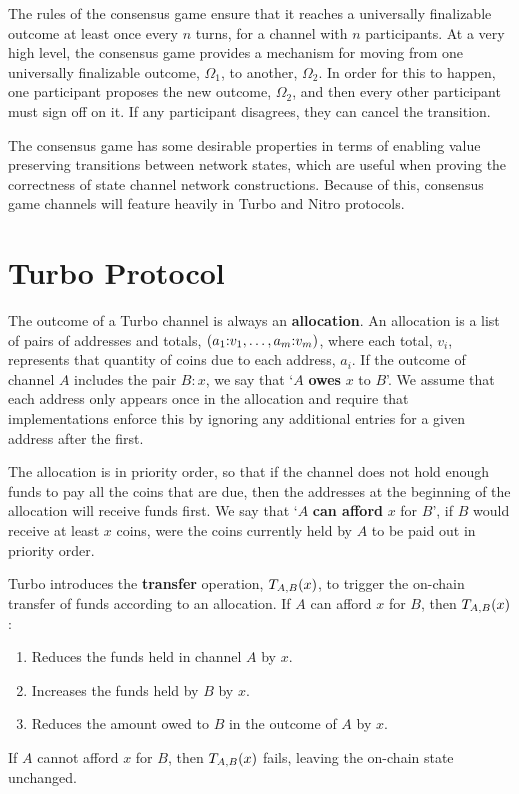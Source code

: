 \documentclass{article}
\begin{document}
The rules of the consensus game ensure that it reaches a universally finalizable outcome at least once every $n$ turns, for a channel with $n$ participants.
At a very high level, the consensus game provides a mechanism for moving from one universally
finalizable outcome, $\Omega_1$, to another, $\Omega_2$. 
In order for this to happen, one participant proposes the new outcome, $\Omega_2$, and then
every other participant must sign off on it. 
If any participant disagrees, they can cancel the transition.

The consensus game has some desirable properties in terms of enabling value preserving transitions between network states, which are useful when proving the correctness of state channel network constructions.
Because of this, consensus game channels will feature heavily in Turbo and Nitro protocols.

\section{Turbo Protocol}

The outcome of a Turbo channel is always an \textbf{allocation}.
An allocation is a list of pairs of addresses and totals, $( a_1{:}v_1, \dots, a_m{:}v_m )$, where each total, $v_i$, represents that quantity of coins due to each address, $a_i$.
If the outcome of channel $A$ includes the pair $B{:}x$, we say that `$A$ \textbf{owes} $x$ to $B$'.
We assume that each address only appears once in the allocation and require that implementations enforce this by ignoring any additional entries for a given address after the first.

The allocation is in priority order, so that if the channel does not hold enough funds to pay all the coins that are due, then the addresses at the beginning of the allocation will receive funds first.
We say that `$A$ \textbf{can afford} $x$ for $B$', if $B$ would receive at least $x$ coins, were the coins currently held by $A$ to be paid out in priority order.

Turbo introduces the \textbf{transfer} operation, $T_{A, B}(x)$, to trigger the on-chain transfer of funds according to an allocation.
If $A$ can afford $x$ for $B$, then $T_{A, B}(x)$:
\begin{enumerate}
  \item Reduces the funds held in channel $A$ by $x$. 
  \item Increases the funds held by $B$ by $x$.
  \item Reduces the amount owed to $B$ in the outcome of $A$ by $x$.
\end{enumerate}
If $A$ cannot afford $x$ for $B$, then $T_{A, B}(x)$ fails, leaving the on-chain state unchanged.
\end{document}
